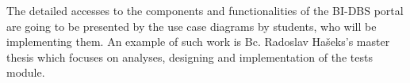 \noindent The detailed accesses to the components and functionalities of the BI-DBS portal are going to be presented by the use case diagrams by students, who will be implementing them. An example of such work is Bc. Radoslav Hašeks's master thesis \cite{mt-hasek} which focuses on analyses, designing and implementation of the tests module.